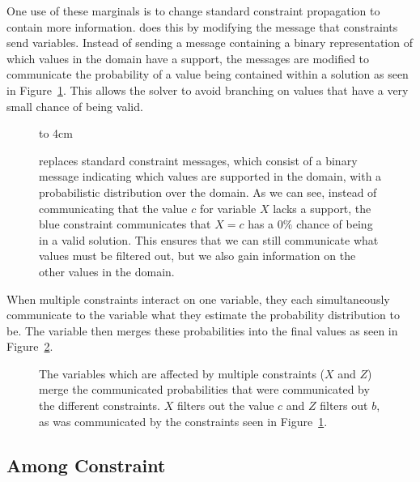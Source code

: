\documentclass[../Document.tex]{subfiles}
\begin{document}
One use of these marginals is to change standard constraint propagation to contain more information. \bp does this by modifying the message that constraints send variables. Instead of sending a message containing a binary representation of which values in the domain have a support, the messages are modified to communicate the probability of a value being contained within a solution as seen in Figure~\ref{fig:cpbp_messaging}. This allows the solver to avoid branching on values that have a very small chance of being valid.




\begin{figure}[ht]
    \centering
    \vspace{0.5cm}
    \vbox to 4cm {
        
    }
    \caption[\acrlong{cpbp} messaging.]{\bp replaces standard constraint messages, which consist of a binary message indicating which values are supported in the domain, with a probabilistic distribution over the domain. As we can see, instead of communicating that the value $c$ for variable $X$ lacks a support, the blue constraint communicates that $X=c$ has a $0\%$ chance of being in a valid solution. This ensures that we can still communicate what values must be filtered out, but we also gain information on the other values in the domain.}
    \label{fig:cpbp_messaging}
\end{figure}

When multiple constraints interact on one variable, they each simultaneously communicate to the variable what they estimate the probability distribution to be. The variable then merges these probabilities into the final values as seen in Figure~\ref{fig:cpbp_combined}.


\begin{figure}[ht]
    \centering
    
    \caption[\acrlong{cpbp} combining probabilities]{The variables which are affected by multiple constraints ($X$ and $Z$) merge the communicated probabilities that were communicated by the different constraints. $X$ filters out the value $c$ and $Z$ filters out $b$, as was communicated by the constraints seen in Figure~\ref{fig:cpbp_messaging}.}
    \label{fig:cpbp_combined}
\end{figure}

\subsection{Among Constraint}
\end{document}
